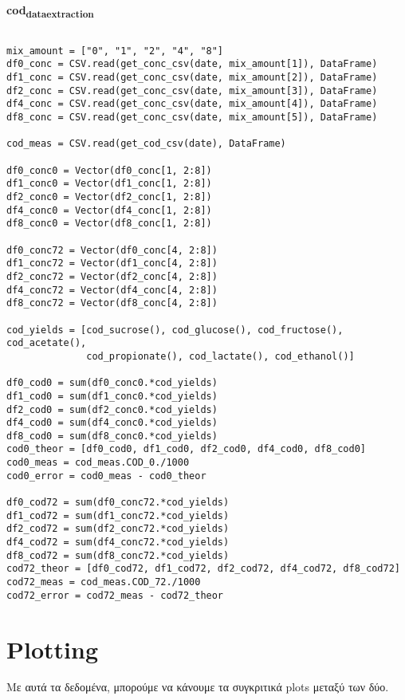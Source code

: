 \documentclass[11pt]{article}
\begin{document}
\textbf{cod\textsubscript{data}\textsubscript{extraction}}
\begin{verbatim}

mix_amount = ["0", "1", "2", "4", "8"]
df0_conc = CSV.read(get_conc_csv(date, mix_amount[1]), DataFrame)
df1_conc = CSV.read(get_conc_csv(date, mix_amount[2]), DataFrame)
df2_conc = CSV.read(get_conc_csv(date, mix_amount[3]), DataFrame)
df4_conc = CSV.read(get_conc_csv(date, mix_amount[4]), DataFrame)
df8_conc = CSV.read(get_conc_csv(date, mix_amount[5]), DataFrame)

cod_meas = CSV.read(get_cod_csv(date), DataFrame)

df0_conc0 = Vector(df0_conc[1, 2:8])
df1_conc0 = Vector(df1_conc[1, 2:8])
df2_conc0 = Vector(df2_conc[1, 2:8])
df4_conc0 = Vector(df4_conc[1, 2:8])
df8_conc0 = Vector(df8_conc[1, 2:8])

df0_conc72 = Vector(df0_conc[4, 2:8])
df1_conc72 = Vector(df1_conc[4, 2:8])
df2_conc72 = Vector(df2_conc[4, 2:8])
df4_conc72 = Vector(df4_conc[4, 2:8])
df8_conc72 = Vector(df8_conc[4, 2:8])

cod_yields = [cod_sucrose(), cod_glucose(), cod_fructose(), cod_acetate(),
              cod_propionate(), cod_lactate(), cod_ethanol()]

df0_cod0 = sum(df0_conc0.*cod_yields)
df1_cod0 = sum(df1_conc0.*cod_yields)
df2_cod0 = sum(df2_conc0.*cod_yields)
df4_cod0 = sum(df4_conc0.*cod_yields)
df8_cod0 = sum(df8_conc0.*cod_yields)
cod0_theor = [df0_cod0, df1_cod0, df2_cod0, df4_cod0, df8_cod0]
cod0_meas = cod_meas.COD_0./1000
cod0_error = cod0_meas - cod0_theor

df0_cod72 = sum(df0_conc72.*cod_yields)
df1_cod72 = sum(df1_conc72.*cod_yields)
df2_cod72 = sum(df2_conc72.*cod_yields)
df4_cod72 = sum(df4_conc72.*cod_yields)
df8_cod72 = sum(df8_conc72.*cod_yields)
cod72_theor = [df0_cod72, df1_cod72, df2_cod72, df4_cod72, df8_cod72]
cod72_meas = cod_meas.COD_72./1000
cod72_error = cod72_meas - cod72_theor

\end{verbatim}

\section{Plotting}
\label{sec:org31b6bac}
Με αυτά τα δεδομένα, μπορούμε να κάνουμε τα συγκριτικά plots μεταξύ των δύο.
\end{document}
